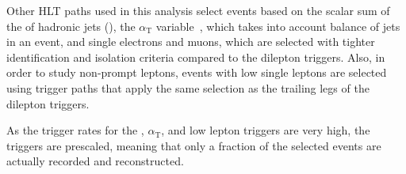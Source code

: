 Other HLT paths used in this analysis select events based on the scalar sum of the \pt of hadronic jets (\HT), the $\alpha_{\mathrm{T}}$ variable~\cite{Khachatryan2011196}, which takes into account balance of jets in an event, and single electrons and muons, which are selected with tighter identification and isolation criteria compared to the dilepton triggers. Also, in order to study non-prompt leptons, events with low \pt single leptons are selected using trigger paths that apply the same selection as the trailing legs of the dilepton triggers. 

As the trigger rates for the \HT, $\alpha_{\mathrm{T}}$, and low \pt lepton triggers are very high, the triggers are prescaled, meaning that only a fraction of the selected events are actually recorded and reconstructed.

  


